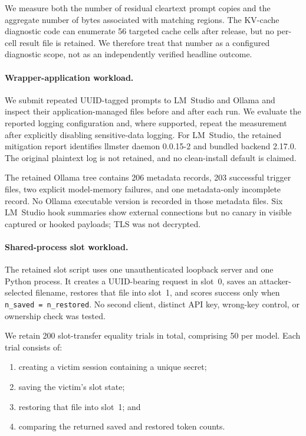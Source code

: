 We measure both the number of residual cleartext prompt copies and the
aggregate number of bytes associated with matching regions. The KV-cache
diagnostic code can enumerate 56 targeted cache cells after release, but no
per-cell result file is retained. We therefore treat that number as a
configured diagnostic scope, not as an independently verified headline
outcome.

\paragraph{Wrapper-application workload.}
We submit repeated UUID-tagged prompts to LM~Studio and Ollama and inspect
their application-managed files before and after each run. We evaluate
the reported logging configuration and, where supported, repeat the
measurement after explicitly disabling sensitive-data logging. For
LM~Studio, the retained mitigation report identifies llmster daemon
0.0.15-2 and bundled backend 2.17.0. The original plaintext log is not
retained, and no clean-install default is claimed.

The retained Ollama tree contains 206 metadata records, 203 successful
trigger files, two explicit model-memory failures, and one metadata-only
incomplete record. No Ollama executable version is recorded in those
metadata files. Six LM~Studio hook summaries show external connections but
no canary in visible captured or hooked payloads; TLS was not decrypted.

\paragraph{Shared-process slot workload.}
The retained slot script uses one unauthenticated loopback server and one
Python process. It creates a UUID-bearing request in slot~0, saves an
attacker-selected filename, restores that file into slot~1, and scores
success only when \texttt{n\_saved = n\_restored}. No second client,
distinct API key, wrong-key control, or ownership check was tested.

We retain 200 slot-transfer equality trials in total, comprising 50 per
model. Each trial consists of:

\begin{enumerate}
    \item creating a victim session containing a unique secret;
    \item saving the victim's slot state;
    \item restoring that file into slot~1; and
    \item comparing the returned saved and restored token counts.
\end{enumerate}

